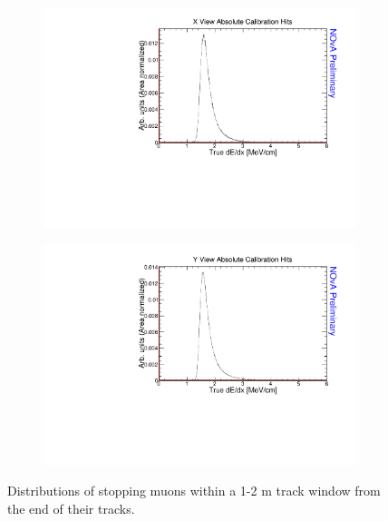 \begin{figure}[ht!]
\begin{subfigure}{0.495\textwidth}
  \end{subfigure}
  \begin{subfigure}{0.495\textwidth}
    \includegraphics[width=\linewidth]{essentialsec_tb/nhits_mev_x.pdf}
  \end{subfigure}
  \begin{subfigure}{0.495\textwidth}
    \includegraphics[width=\linewidth]{essentialsec_tb/nhits_mev_y.pdf}
  \end{subfigure}
  \caption{Distributions of stopping muons within a 1-2 m track window from the end of their tracks.}
  \label{fig:AbsCalibNHitsMEU}
\end{figure}

